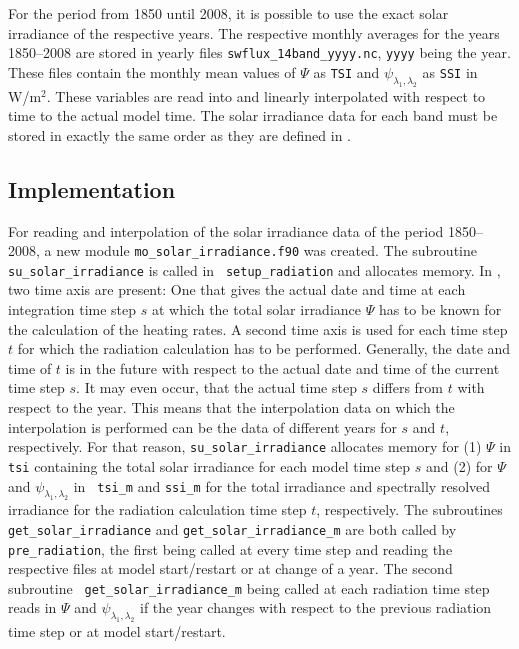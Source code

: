 \begin{appendix}
For the period from 1850 until 2008, it is possible to use the 
exact solar irradiance of the respective years.
The respective
monthly averages for the years 1850--2008 are stored in yearly files
{\tt swflux\_14band\_yyyy.nc}, {\tt yyyy} being the year.
These files contain the monthly mean values of $\Psi$ as {\tt TSI} and
$\psi_{\lambda_1,\lambda_2}$ as {\tt SSI} in W/m$^2$. These variables
are read into \echam{} and linearly interpolated with respect to time to
the actual model time. The solar irradiance data for each band must be
stored in exactly the same order as they are defined in \echam.

\subsection{Implementation}

For reading and interpolation of the solar irradiance data of the
period 1850--2008, a new module {\tt mo\_solar\_irradiance.f90} was
created. The subroutine {\tt su\_solar\_irradiance} is called in {\tt
  setup\_radiation} and allocates memory. In \echam, two time axis are 
present: One that gives the actual date and time at each integration
time step $s$ at which the total solar irradiance $\Psi$ has to be known
for the calculation of the heating rates. A second time axis is used 
for each 
time step $t$ for which the radiation calculation has to be
performed. Generally, the date and time of $t$ is in the future with
respect to the actual date and time of the current time step $s$. It
may even occur, that the actual time step $s$ differs from $t$
with respect to the year. This means that the interpolation data
on which the interpolation is performed can be the data of different
years for $s$ and $t$, respectively. For that 
reason, {\tt su\_solar\_irradiance} allocates memory for (1) $\Psi$ in
{\tt tsi} containing the total solar irradiance for each model time
step $s$ and (2) for $\Psi$ and $\psi_{\lambda_1,\lambda_2}$ in {\tt
  tsi\_m} and {\tt ssi\_m} for the total irradiance and spectrally
resolved irradiance for the radiation calculation time step $t$,
respectively. 
The subroutines
 {\tt get\_solar\_irradiance} and {\tt get\_solar\_irradiance\_m}
are both called by {\tt pre\_radiation}, the first being called at
every time step and reading the respective files at
model start/restart or at change of a year. The second subroutine {\tt
  get\_solar\_irradiance\_m} being called at each radiation time step
reads in $\Psi$ and $\psi_{\lambda_1,\lambda_2}$ if the year changes
with respect to the previous radiation time step or at model
start/restart. 


\end{appendix}
